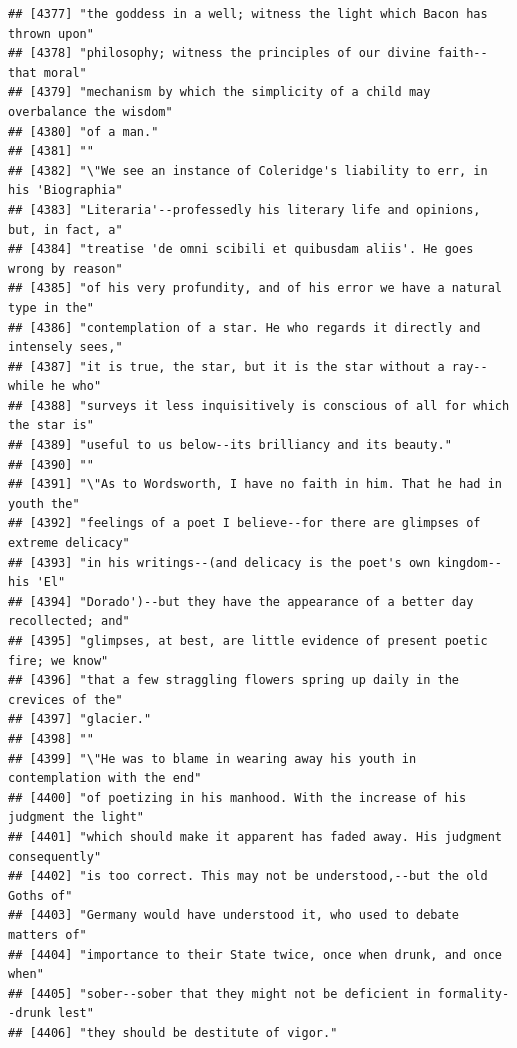 \documentclass{article}\usepackage[]{graphicx}\usepackage[]{color}
\makeatletter
\newenvironment{kframe}{%
 \def\at@end@of@kframe{}%
 \ifinner\ifhmode%
  \def\at@end@of@kframe{\end{minipage}}%
  \begin{minipage}{\columnwidth}%
 \fi\fi%
 \def\FrameCommand##1{\hskip\@totalleftmargin \hskip-\fboxsep
 \colorbox{shadecolor}{##1}\hskip-\fboxsep
     \hskip-\linewidth \hskip-\@totalleftmargin \hskip\columnwidth}%
 \MakeFramed {\advance\hsize-\width
   \@totalleftmargin\z@ \linewidth\hsize
   \@setminipage}}%
 {\par\unskip\endMakeFramed%
 \at@end@of@kframe}
\newenvironment{knitrout}{}{} %
\makeatother
\begin{document}
\begin{knitrout}
\begin{kframe}
\begin{verbatim}
## [4377] "the goddess in a well; witness the light which Bacon has thrown upon"        
## [4378] "philosophy; witness the principles of our divine faith--that moral"          
## [4379] "mechanism by which the simplicity of a child may overbalance the wisdom"     
## [4380] "of a man."                                                                   
## [4381] ""                                                                            
## [4382] "\"We see an instance of Coleridge's liability to err, in his 'Biographia"    
## [4383] "Literaria'--professedly his literary life and opinions, but, in fact, a"     
## [4384] "treatise 'de omni scibili et quibusdam aliis'. He goes wrong by reason"      
## [4385] "of his very profundity, and of his error we have a natural type in the"      
## [4386] "contemplation of a star. He who regards it directly and intensely sees,"     
## [4387] "it is true, the star, but it is the star without a ray--while he who"        
## [4388] "surveys it less inquisitively is conscious of all for which the star is"     
## [4389] "useful to us below--its brilliancy and its beauty."                          
## [4390] ""                                                                            
## [4391] "\"As to Wordsworth, I have no faith in him. That he had in youth the"        
## [4392] "feelings of a poet I believe--for there are glimpses of extreme delicacy"    
## [4393] "in his writings--(and delicacy is the poet's own kingdom--his 'El"           
## [4394] "Dorado')--but they have the appearance of a better day recollected; and"     
## [4395] "glimpses, at best, are little evidence of present poetic fire; we know"      
## [4396] "that a few straggling flowers spring up daily in the crevices of the"        
## [4397] "glacier."                                                                    
## [4398] ""                                                                            
## [4399] "\"He was to blame in wearing away his youth in contemplation with the end"   
## [4400] "of poetizing in his manhood. With the increase of his judgment the light"    
## [4401] "which should make it apparent has faded away. His judgment consequently"     
## [4402] "is too correct. This may not be understood,--but the old Goths of"           
## [4403] "Germany would have understood it, who used to debate matters of"             
## [4404] "importance to their State twice, once when drunk, and once when"             
## [4405] "sober--sober that they might not be deficient in formality--drunk lest"      
## [4406] "they should be destitute of vigor."                                          

\end{verbatim}
\end{kframe}
\end{knitrout}
\end{document}
